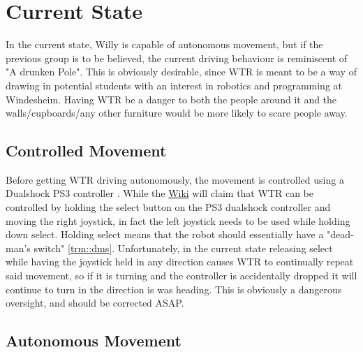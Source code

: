 \section{Current State}
In the current state, Willy is capable of autonomous movement, but if the previous group is to be believed, the current driving behaviour is reminiscent of "A drunken Pole".
This is obviously desirable, since WTR is meant to be a way of drawing in potential students with an interest in robotics and programming at Windesheim.
Having WTR be a danger to both the people around it and the walls/cupboards/any other furniture would be more likely to scare people away.

\subsection{Controlled Movement}
Before getting WTR driving autonomously, the movement is controlled using a Dualshock PS3 controller \cite{dualshock}.
While the \href{ https://windesheim-willy.github.io/WillyWiki/components/joystick.html}{Wiki} will claim that WTR can be controlled by holding the select button on the PS3 dualshock controller and moving the right joystick, in fact the left joystick needs to be used while holding down select.
Holding select means that the robot should essentially have a "dead-man's switch" \ref{trm::dms}.
Unfortunately, in the current state releasing select while having the joystick held in any direction causes WTR to continually repeat said movement, so if it is turning and the controller is accidentally dropped it will continue to turn in the direction is was heading.
This is obviously a dangerous oversight, and should be corrected ASAP.

\subsection{Autonomous Movement}

